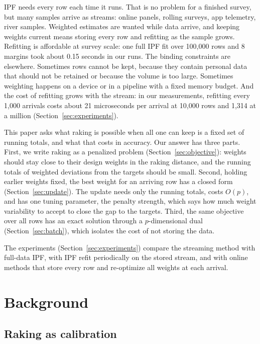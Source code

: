 \documentclass[12pt, letterpaper]{article}
\begin{document}
IPF needs every row each time it runs. That is no problem for a finished survey, but many samples arrive as streams: online panels, rolling surveys, app telemetry, river samples. Weighted estimates are wanted while data arrive, and keeping weights current means storing every row and refitting as the sample grows. Refitting is affordable at survey scale: one full IPF fit over 100,000 rows and 8 margins took about 0.15 seconds in our runs. The binding constraints are elsewhere. Sometimes rows cannot be kept, because they contain personal data that should not be retained or because the volume is too large. Sometimes weighting happens on a device or in a pipeline with a fixed memory budget. And the cost of refitting grows with the stream: in our measurements, refitting every 1,000 arrivals costs about 21 microseconds per arrival at 10,000 rows and 1,314 at a million (Section~\ref{sec:experiments}).

This paper asks what raking is possible when all one can keep is a fixed set of running totals, and what that costs in accuracy. Our answer has three parts. First, we write raking as a penalized problem (Section~\ref{sec:objective}): weights should stay close to their design weights in the raking distance, and the running totals of weighted deviations from the targets should be small. Second, holding earlier weights fixed, the best weight for an arriving row has a closed form (Section~\ref{sec:update}). The update needs only the running totals, costs $O(p)$, and has one tuning parameter, the penalty strength, which says how much weight variability to accept to close the gap to the targets. Third, the same objective over all rows has an exact solution through a $p$-dimensional dual (Section~\ref{sec:batch}), which isolates the cost of not storing the data.

The experiments (Section~\ref{sec:experiments}) compare the streaming method with full-data IPF, with IPF refit periodically on the stored stream, and with online methods that store every row and re-optimize all weights at each arrival.

\section{Background}
\label{sec:background}

\subsection{Raking as calibration}
\end{document}
